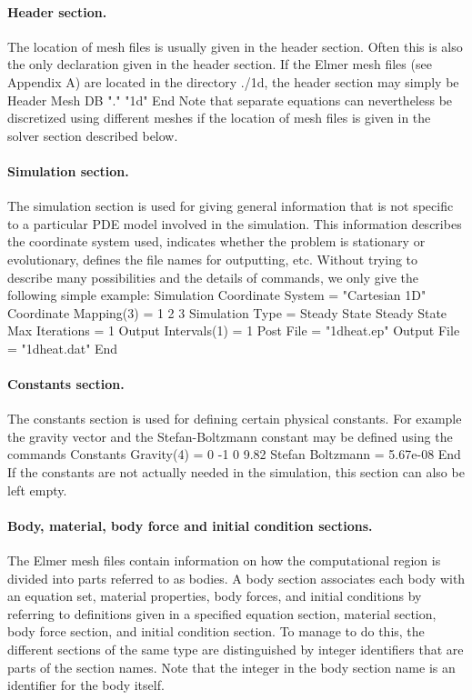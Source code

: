 \paragraph{Header section.}
The location of mesh files is usually given in the header section. Often this is also
the only declaration given in the header section. If the Elmer mesh files (see Appendix A) are located in the 
directory ./1d, the header section may simply be 
\ttbegin
Header
  Mesh DB "." "1d"
End
\ttend
Note that separate equations can nevertheless be discretized using different meshes if the location of mesh files is given 
in the solver section described below. 

\paragraph{Simulation section.}
The simulation section is used for giving general information that is not specific
to a particular PDE model involved in the simulation. This information describes the coordinate system used,
indicates whether the problem is stationary or evolutionary, defines the file names for outputting, etc.
Without trying to describe many possibilities and the details of commands, 
we only give the following simple example:  
\ttbegin
Simulation
  Coordinate System = "Cartesian 1D"
  Coordinate Mapping(3) = 1 2 3
  Simulation Type = Steady State
  Steady State Max Iterations = 1
  Output Intervals(1) = 1
  Post File = "1dheat.ep"
  Output File = "1dheat.dat"
End
\ttend



\paragraph{Constants section.}
The constants section is used for defining certain physical constants. 
For example the gravity vector and the Stefan-Boltzmann constant may be defined using the commands 
\ttbegin
Constants
  Gravity(4) = 0 -1 0 9.82
  Stefan Boltzmann = 5.67e-08
End
\ttend
If the constants are not actually 
needed in the simulation, this section can also be left empty. 

\paragraph{Body, material, body force and initial condition sections.} 
The Elmer mesh files contain information on how the computational region
is divided into parts referred to as bodies. A body section associates
each body with an equation set, material properties, body forces, and initial conditions by 
referring to definitions given in a specified equation section, material section, body force section, and
initial condition section. To manage to do this, the different sections of the same type are distinguished
by integer identifiers that are parts of the section names. Note that the integer in the body section name 
is an identifier for the body itself. 

